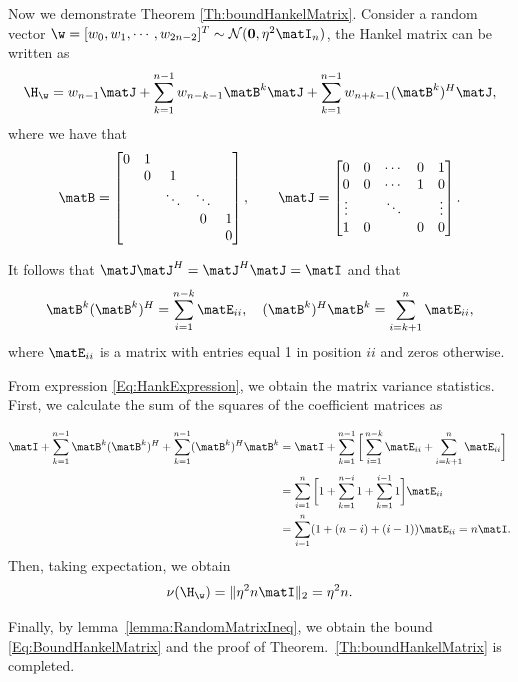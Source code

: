 Now we demonstrate Theorem \ref{Th:boundHankelMatrix}. Consider a random vector $\w = [w_0, w_1,\cdots,w_{2n-2}]^T\sim\mathcal{N}(\mathbf{0},\eta^2\matI_n)$, the Hankel matrix can be written as																
\begin{equation}
	\H_{\w} = w_{n-1}\matJ + \sum_{k=1}^{n-1}
	w_{n-k-1}\matB^k\matJ + \sum_{k=1}^{n-1}w_{n+k-1}(\matB^k)^H\matJ,
	\label{Eq:HankExpression}
\end{equation}
where we have that
\[\matB = \begin{bmatrix} 0 & 1 & 		  &        &  \\
	& 0 & 1      &        &  \\
	&   & \ddots & \ddots &   \\
	&   &        &  0     & 1 \\
	&   &        &        & 0
\end{bmatrix}, \qquad \matJ = \begin{bmatrix} 0  & 0 & \cdots & 0 & 1\\
	0  & 0 & \cdots & 1 & 0\\
	\vdots &   & \ddots &   & \vdots \\
	1      & 0 &        & 0 & 0
\end{bmatrix}.\]

It follows that $\matJ\matJ^H = \matJ^H\matJ = \matI$ and that
\[\matB^k(\matB^k)^H = \sum_{i=1}^{n-k}\matE_{ii},\quad (\matB^k)^H\matB^k = \sum_{i=k+1}^{n}\matE_{ii},\]
where $\matE_{ii}$ is a matrix with entries equal 1 in position $ii$ and zeros otherwise.

From expression \eqref{Eq:HankExpression}, we obtain the matrix variance statistics. First, we calculate the sum of the squares of the coefficient matrices as 

\[\begin{aligned}
	\matI + \sum_{k=1}^{n-1}\matB^k(\matB^k)^H + \sum_{k=1}^{n-1}(\matB^k)^H\matB^k & = \matI + \sum_{k=1}^{n-1}\bigg[\sum_{i=1}^{n-k}\matE_{ii} + \sum_{i=k+1}^{n}\matE_{ii}\bigg]\\[0.3em]
	& = \sum_{i=1}^n\bigg[1 + \sum_{k=1}^{n-i}1+\sum_{k=1}^{i-1}1\bigg]\matE_{ii} \\
	& = \sum_{i=1}^n(1+(n-i)+(i-1))\matE_{ii} = n\matI.
\end{aligned}\]	
Then, taking expectation, we obtain
\[\nu(\H_{\w}) = \|\eta^2n\matI\|_2 = \eta^2n.\]

Finally, by lemma~\ref{lemma:RandomMatrixIneq}, we obtain the bound \eqref{Eq:BoundHankelMatrix} and the proof of Theorem.~\ref{Th:boundHankelMatrix} is completed.

